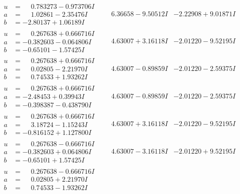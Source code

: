 \documentclass[1p]{elsarticle_modified}
\theoremstyle{definition}
\begin{document}
$$\begin{array}{c|c|c}
\begin{aligned}
u &= \phantom{-}0.783273 - 0.973706 I \\
a &= \phantom{-}1.02861 - 2.35476 I \\
b &= -2.80137 + 1.06189 I\end{aligned}
 & \phantom{-}6.36658 - 9.50512 I & -2.22908 + 9.01871 I \\ \hline\begin{aligned}
u &= \phantom{-}0.267638 + 0.666716 I \\
a &= -0.382603 - 0.064806 I \\
b &= -0.65101 - 1.57425 I\end{aligned}
 & \phantom{-}4.63007 + 3.16118 I & -2.01220 - 9.52195 I \\ \hline\begin{aligned}
u &= \phantom{-}0.267638 + 0.666716 I \\
a &= \phantom{-}0.02805 - 2.21970 I \\
b &= \phantom{-}0.74533 + 1.93262 I\end{aligned}
 & \phantom{-}4.63007 - 0.89859 I & -2.01220 - 2.59375 I \\ \hline\begin{aligned}
u &= \phantom{-}0.267638 + 0.666716 I \\
a &= -2.48453 + 0.39943 I \\
b &= -0.398387 - 0.438790 I\end{aligned}
 & \phantom{-}4.63007 - 0.89859 I & -2.01220 - 2.59375 I \\ \hline\begin{aligned}
u &= \phantom{-}0.267638 + 0.666716 I \\
a &= \phantom{-}3.18724 - 1.15243 I \\
b &= -0.816152 + 1.127800 I\end{aligned}
 & \phantom{-}4.63007 + 3.16118 I & -2.01220 - 9.52195 I \\ \hline\begin{aligned}
u &= \phantom{-}0.267638 - 0.666716 I \\
a &= -0.382603 + 0.064806 I \\
b &= -0.65101 + 1.57425 I\end{aligned}
 & \phantom{-}4.63007 - 3.16118 I & -2.01220 + 9.52195 I \\ \hline\begin{aligned}
u &= \phantom{-}0.267638 - 0.666716 I \\
a &= \phantom{-}0.02805 + 2.21970 I \\
b &= \phantom{-}0.74533 - 1.93262 I\end{aligned}

\end{array}$$
\end{document}
